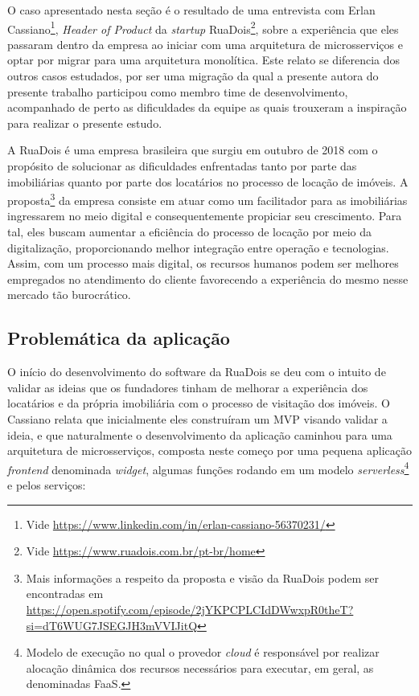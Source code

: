 O caso apresentado nesta seção é o resultado de uma entrevista com Erlan Cassiano\footnote{Vide
\url{https://www.linkedin.com/in/erlan-cassiano-56370231/}}, \textit{Header of Product} da
\textit{startup} RuaDois\footnote{Vide \url{https://www.ruadois.com.br/pt-br/home}}, sobre a
experiência que eles passaram dentro da empresa ao iniciar com uma arquitetura de microsserviços
e optar por migrar para uma arquitetura monolítica. Este relato se diferencia dos outros casos
estudados, por ser uma migração da qual a presente autora do presente trabalho participou como
membro time de desenvolvimento, acompanhado de perto as dificuldades da equipe as quais trouxeram a
inspiração para realizar o presente estudo.

A RuaDois é uma empresa brasileira que surgiu em outubro de 2018 com o propósito de
solucionar as dificuldades enfrentadas tanto por parte das imobiliárias quanto por parte dos
locatários no processo de locação de imóveis. A proposta\footnote{Mais informações a respeito
da proposta e visão da RuaDois podem ser encontradas em
\url{https://open.spotify.com/episode/2jYKPCPLCIdDWwxpR0theT?si=dT6WUG7JSEGJH3mVVIJitQ}}
da empresa consiste em atuar como um facilitador para as imobiliárias
ingressarem no meio digital e consequentemente propiciar seu crescimento. Para tal,
eles buscam aumentar a eficiência do processo de locação por meio da digitalização,
proporcionando melhor integração entre operação e tecnologias. Assim, com um processo
mais digital, os recursos humanos podem ser melhores empregados no atendimento do
cliente favorecendo a experiência do mesmo nesse mercado tão burocrático.

\subsection{Problemática da aplicação}

O início do desenvolvimento do software da RuaDois se deu com o intuito de validar as ideias que
os fundadores tinham de melhorar a experiência dos locatários e da própria imobiliária com o processo
de visitação dos imóveis. O Cassiano relata que inicialmente eles construíram um \gls{MVP} visando
validar a ideia, e que naturalmente o desenvolvimento da aplicação caminhou para uma arquitetura de
microsserviços, composta neste começo por uma pequena aplicação \textit{frontend} denominada
\textit{widget}, algumas funções rodando em um modelo \textit{serverless}\footnote{Modelo de
execução no qual o provedor \textit{cloud} é responsável por realizar alocação dinâmica dos recursos
necessários para executar, em geral, as denominadas \gls{FaaS}.} e pelos serviços:

